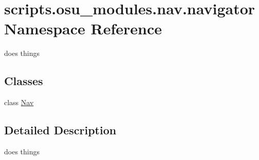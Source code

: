 \hypertarget{namespacescripts_1_1osu__modules_1_1nav_1_1navigator}{}\section{scripts.\+osu\+\_\+modules.\+nav.\+navigator Namespace Reference}
\label{namespacescripts_1_1osu__modules_1_1nav_1_1navigator}


does things  


\subsection*{Classes}
\begin{DoxyCompactItemize}
\item 
class \hyperlink{classscripts_1_1osu__modules_1_1nav_1_1navigator_1_1Nav}{Nav}
\end{DoxyCompactItemize}


\subsection{Detailed Description}
does things 
